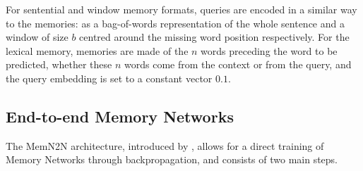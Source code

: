 
For sentential and window memory formats, queries are encoded in a similar way to the memories: as a bag-of-words representation of the whole sentence and a window of size $b$ centred around the missing word position respectively.
%
For the lexical memory, memories are made of the $n$ words preceding the word to be predicted, whether these $n$ words come from the context or from the query, and the query embedding is set to a constant vector $0.1$. 

\subsection{End-to-end Memory Networks} \label{sec:mod_o}

The {MemN2N} architecture, introduced by \cite{sukhbaatar2015end}, allows for a direct training of Memory Networks through backpropagation, and consists of two main steps.

